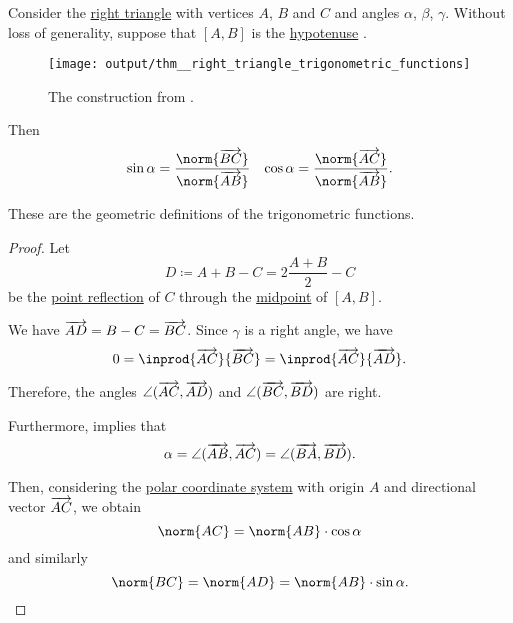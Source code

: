 \begin{proposition}\label{thm:right_triangle_trigonometric_functions}
  Consider the \hyperref[def:triangle/right]{right triangle} with vertices \( A \), \( B \) and \( C \) and angles \( \alpha \), \( \beta \), \( \gamma \). Without loss of generality, suppose that \( [A, B] \) is the \hyperref[thm:right_triangle]{hypotenuse} .

  \begin{figure}[!ht]
    \centering
    \texttt{[image: output/thm\_\_right\_triangle\_trigonometric\_functions]}
    \caption{The construction from .}\label{fig:thm:right_triangle_trigonometric_functions}
  \end{figure}

  Then
  \begin{align*}
    \sin \alpha = \frac {\norm{\vect{BC}}} {\norm{\vect{AB}}}
    &&
    \cos \alpha = \frac {\norm{\vect{AC}}} {\norm{\vect{AB}}}.
  \end{align*}

  These are the geometric definitions of the trigonometric functions.
\end{proposition}
\begin{proof}
  Let
  \begin{equation*}
    D \coloneqq A + B - C = 2 \frac {A + B} 2 - C
  \end{equation*}
  be the \hyperref[def:rigid_motion/point_reflection]{point reflection} of \( C \) through the \hyperref[thm:segment_midpoint]{midpoint} of \( [A, B] \).

  We have \( \overrightarrow{AD} = B - C = \overrightarrow{BC} \). Since \( \gamma \) is a right angle, we have
  \begin{equation*}
    0
    =
    \inprod{\vect{AC}} {\vect{BC}}
    =
    \inprod{\vect{AC}} {\vect{AD}}.
  \end{equation*}

  Therefore, the angles \( \angle(\overrightarrow{AC},\overrightarrow{AD}) \) and \( \angle(\overrightarrow{BC},\overrightarrow{BD}) \) are right.

  Furthermore,  implies that
  \begin{equation*}
    \alpha = \angle(\overrightarrow{AB},\overrightarrow{AC}) = \angle(\overrightarrow{BA},\overrightarrow{BD}).
  \end{equation*}

  Then, considering the \hyperref[rem:polar_coordinate_system]{polar coordinate system} with origin \( A \) and directional vector \( \overrightarrow{AC} \), we obtain
  \begin{equation*}
    \norm{AC} = \norm{AB} \cdot \cos \alpha
  \end{equation*}
  and similarly
  \begin{equation*}
    \norm{BC} = \norm{AD} = \norm{AB} \cdot \sin \alpha.
  \end{equation*}
\end{proof}

